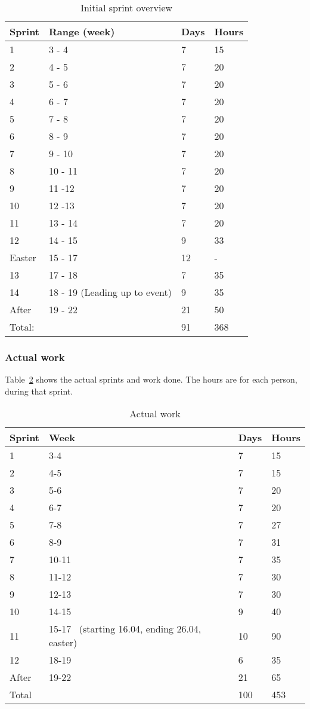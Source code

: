 \begin{longtable}{|l|l|l|l|}
\caption{Initial sprint overview} \label{table:sprintoverview} \\
\hline
 Sprint & Range (week) & Days &
 Hours\\\hline
 1 & 3 - 4 & 7 & 15\\\hline
 2 & 4 - 5 & 7 & 20\\\hline
 3 & 5 - 6 & 7 & 20 \\\hline
 4 & 6 - 7 & 7 & 20 \\\hline
 5 & 7 - 8 & 7 & 20\\\hline
 6 & 8 - 9 & 7 & 20\\\hline
 7 & 9 - 10 & 7 & 20\\\hline
 8 & 10 - 11 & 7 & 20\\\hline
 9 & 11 -12 & 7 & 20\\\hline
 10 & 12 -13 & 7 & 20\\\hline
 11 & 13 - 14 & 7 & 20\\\hline
 12 & 14 - 15 & 9 & 33\\\hline
 Easter & 15 - 17 & 12 & {}-\\\hline
 13 & 17 - 18 & 7 & 35\\\hline
 14 & 18 - 19 (Leading up to event) & 9 & 35\\\hline
 After & 19 - 22 & 21 & 50\\\hline
 Total: & & 91 & 368\\\hline
\end{longtable}


\subsubsection{Actual work}
Table~\ref{table:actualWork} shows the actual sprints and work done. The hours
are for each person, during that sprint.
\begin{longtable}{|l|l|l|l|}
\caption{Actual work} \label{table:actualWork} \\
\hline
 Sprint & Week & Days & Hours \\\hline
 1 & 3-4 & 7 & 15\\\hline
 2 & 4-5  & 7  & 15\\\hline
 3 & 5-6 & 7  & 20\\\hline
 4 & 6-7 & 7 & 20\\\hline
 5 & 7-8 & 7 & 27\\\hline
 6 & 8-9  & 7  & 31\\\hline
 7 & 10-11 & 7  & 35\\\hline
 8 & 11-12 & 7 & 30\\\hline
 9 & 12-13 & 7  & 30\\\hline
 10 & 14-15 & 9 & 40\\\hline
 11 & 15-17 \ (starting 16.04, ending 26.04, easter) & 10 & 90\\\hline
 12 & 18-19 & 6 & 35\\\hline
 After & 19-22 & 21 & 65\\\hline
 Total & & 100 & 453\\\hline
\end{longtable}
